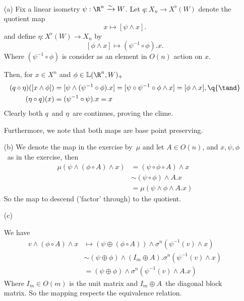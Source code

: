\begin{exercise}[2]\ 
\begin{enumerate}
\item[(a)]
Fix a linear isometry $\psi: \R^n \simto W$. Let 
$q : X_n \to X^\flat(W)$ denote the quotient map 
\[ x \mapsto [\psi \wedge x]. \]
and define $\eta: X^\flat(W) \to X_n$ by 
\[ [\phi \wedge x] \mapsto (\psi^{-1} \circ \phi) . x. \]
Where $(\psi^{-1} \circ \phi)$ is consider as an element in $O(n)$ action on
$x$.

Then, for $x \in X^n$ and $\phi \in \L(\R^n, W)_+$ 
\begin{align*}
(q \circ \eta) ([x \wedge \phi]) 
&= [\psi \wedge (\psi^{-1} \circ \phi) . x ] 
= [\psi \circ \psi^{-1} \circ \phi \wedge x]
= [\phi \wedge x], \q{\tand} \\
(\eta \circ q) (x) 
&= (\psi^{-1} \circ \psi) . x 
= x
\end{align*}
Clearly both $q$ and $\eta$ are continues, proving the clime.

Furthermore, we note that both maps are base point preserving.

\item[(b)]
We denote the map in the exercise by $\mu$ and
let $A \in O(n)$, and $x, \psi, \phi$ as in the exercise, then 
\begin{align*}
\mu( \psi \wedge (\phi \circ A) \wedge x ) 
&= (\psi \circ \phi \circ A) \wedge x  \\
&\sim (\psi \circ \phi) \wedge A . x \\
&= \mu( \psi \wedge \phi \wedge A . x ) 
\end{align*}
So the map to descend ('factor' through) to the quotient. 

\item[(c)]

We have 
\begin{align*}
v \wedge (\phi \circ A) \wedge x 
&\mapsto (\psi \oplus (\phi \circ A)) \wedge \sigma^n(\psi^{-1}(v) \wedge x) \\
&\sim (\psi \oplus \phi) \wedge (I_m\oplus A) . \sigma^n (\psi^{-1}(v) \wedge x)
\\
&= (\psi \oplus \phi) \wedge \sigma^n (\psi^{-1}(v) \wedge A.x)
\end{align*}
Where $I_m \in O(m)$ is the unit matrix and $I_m\oplus A$ the diagonal block
matrix. So the mapping respects the equivalence relation. 


\end{enumerate}
\end{exercise}
